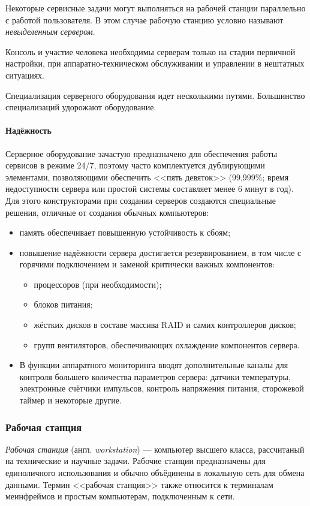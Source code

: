 Некоторые сервисные задачи могут выполняться на рабочей станции параллельно с работой пользователя.
В этом случае рабочую станцию условно называют \emph{невыделенным сервером}.

Консоль и участие человека необходимы серверам только на стадии первичной настройки, при аппаратно-техническом обслуживании и управлении в нештатных ситуациях.

Специализация серверного оборудования идет несколькими путями.
Большинство специализаций удорожают оборудование.

\paragraph{Надёжность}
Серверное оборудование зачастую предназначено для обеспечения работы сервисов в режиме 24/7, поэтому часто комплектуется дублирующими элементами, позволяющими обеспечить <<пять девяток>> (99,999\%; время недоступности сервера или простой системы составляет менее 6 минут в год).
Для этого конструкторами при создании серверов создаются специальные решения, отличные от создания обычных компьютеров:
\begin{itemize}
 \item память обеспечивает повышенную устойчивость к сбоям;
 \item повышение надёжности сервера достигается резервированием, в том числе с горячими подключением и заменой критически важных компонентов:
 \begin{itemize}
  \item процессоров (при необходимости);
  \item блоков питания;
  \item жёстких дисков в составе массива RAID и самих контроллеров дисков;
  \item групп вентиляторов, обеспечивающих охлаждение компонентов сервера.
 \end{itemize}
 \item В функции аппаратного мониторинга вводят дополнительные каналы для контроля большего количества параметров сервера: датчики температуры, электронные счётчики импульсов, контроль напряжения питания, сторожевой таймер и некоторые другие.
\end{itemize}

\subsubsection{Рабочая станция}\label{base:introduction:computer:classification:workstation}
\emph{Рабочая станция} (англ. \emph{workstation}) --- компьютер высшего класса, рассчитаный на технические и научные задачи.
Рабочие станции предназначены для единоличного использования и обычно объёдинены в локальную сеть для обмена данными.
Термин <<рабочая станция>> также относится к терминалам меинфреймов и простым компьютерам, подключенным к сети.

